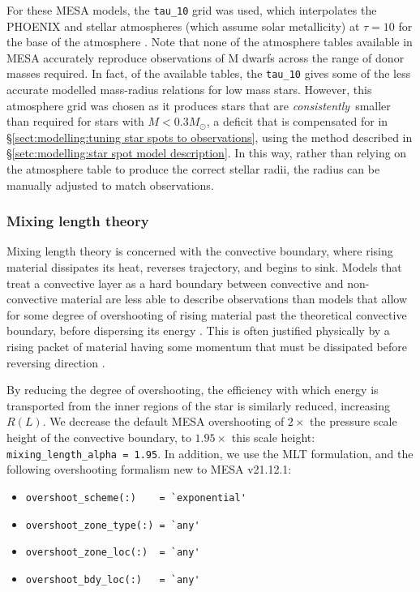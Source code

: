 For these MESA models, the \lstinline{tau_10} grid was used, which interpolates the PHOENIX \citep{hauschildt1999, hauschildt2001} and \citet{castelli2003} stellar atmospheres (which assume solar metallicity) at $\tau = 10$ for the base of the atmosphere \citep{paxton2010,paxton2011}.
Note that none of the atmosphere tables available in MESA accurately reproduce observations of M dwarfs across the range of donor masses required. In fact, of the available tables, the \lstinline{tau_10} gives some of the less accurate modelled mass-radius relations for low mass stars.
However, this atmosphere grid was chosen as it produces stars that are {\it consistently}\ smaller than required for stars with $M < 0.3 M_\odot$, a deficit that is compensated for in \S\ref{sect:modelling:tuning star spots to observations}, using the method described in \S\ref{setc:modelling:star spot model description}. In this way, rather than relying on the atmosphere table to produce the correct stellar radii, the radius can be manually adjusted to match observations.


\subsubsection{Mixing length theory}

Mixing length theory is concerned with the convective boundary, where rising material dissipates its heat, reverses trajectory, and begins to sink.
Models that treat a convective layer as a hard boundary between convective and non-convective material are less able to describe observations than models that allow for some degree of overshooting of rising material past the theoretical convective boundary, before dispersing its energy \citep{prandtl1925}. This is often justified physically by a rising packet of material having some momentum that must be dissipated before reversing direction \citep{bradshaw1974}.

By reducing the degree of overshooting, the efficiency with which energy is transported from the inner regions of the star is similarly reduced, increasing $R(L)$. We decrease the default MESA overshooting of $2\times$ the pressure scale height of the convective boundary, to $1.95\times$ this scale height: \lstinline{mixing_length_alpha = 1.95}. In addition, we use the \citet{henyay1965} MLT formulation, and the following overshooting formalism new to MESA v21.12.1:
\begin{itemize}
    \setlength\itemsep{0em}
    \item \lstinline{overshoot_scheme(:)    = `exponential'}
    \item \lstinline{overshoot_zone_type(:) = `any'}
    \item \lstinline{overshoot_zone_loc(:)  = `any'}
    \item \lstinline{overshoot_bdy_loc(:)   = `any'}
\end{itemize}


